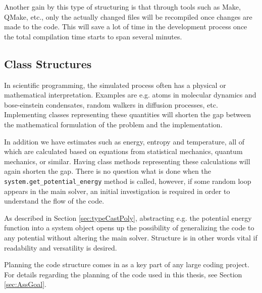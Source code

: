 Another gain by this type of structuring is that through tools such as Make, QMake, etc., only the actually changed files will be recompiled once changes are made to the code. This will save a lot of time in the development process once the total compilation time starts to span several minutes.

\subsection{Class Structures}

In scientific programming, the simulated process often has a physical or mathematical interpretation. Examples are e.g. atoms in molecular dynamics and bose-einstein condensates, random walkers in diffusion processes, etc. Implementing classes representing these quantities will shorten the gap between the mathematical formulation of the problem and the implementation.

In addition we have estimates such as energy, entropy and temperature, all of which are calculated based on equations from statistical mechanics, quantum mechanics, or similar. Having class methods representing these calculations will again shorten the gap. There is no question what is done when the \verb+system.get_potential_energy+ method is called, however, if some random loop appears in the main solver, an initial investigation is required in order to understand the flow of the code.

As described in Section \ref{sec:typeCastPoly}, abstracting e.g. the potential energy function into a system object opens up the possibility of generalizing the code to any potential without altering the main solver. Structure is in other words vital if readability and versatility is desired. 

Planning the code structure comes in as a key part of any large coding project. For details regarding the planning of the code used in this thesis, see Section \ref{sec:AssGoal}.
